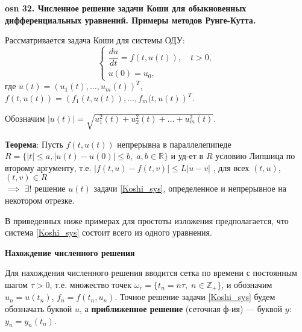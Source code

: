 \setcounter{section}{15}
\setcounter{subsection}{32}
\setcounter{equation}{0}
\textbf{\LARGE osn 32. Численное решение задачи Коши для обыкновенных дифференциальных уравнений. Примеры методов Рунге-Кутта.}


Рассматривается задача Коши для системы ОДУ:
\begin{equation}
%
    \label{Koshi_sys}
    \begin{cases}
        \dfrac{du}{dt} = f(t, u(t)), \quad t > 0, \\
        u(0) = u_0,
    \end{cases}
\end{equation}
%
где
$u(t)=\left(u_1(t), \dots, u_m(t)\right)^T$, $f(t, u(t)) = \left(f_1(t, u(t)), \dots, f_m(t,u(t)\right)^T$.

Обозначим $ | u(t) | = \sqrt{u_1^2(t) + u_2^2(t) + \ldots + u_m^2(t)}$.

\textbf{Теорема}: Пусть $f(t, u(t))$ непрерывна в параллелепипеде 
$ R = \{|t| \leqslant a, | u(t)-u(0)| \leqslant b,\; a, b\in\mathbb{R}\} $ 
и уд-ет в $R$ условию Липшица по второму аргументу, т.е. 
$|f(t, u) - f(t, v)| \leqslant L|u - v|$
, для всех $(t, u)$, $(t, v) \in R$\\ 
$\implies $
$\exists!$ решение $u(t)$ задачи \eqref{Koshi_sys}, определенное и непрерывное на некотором отрезке.



В приведенных ниже примерах для простоты изложения предполагается, что
система \eqref{Koshi_sys} состоит всего из одного уравнения.

\centerline{\textbf{Нахождение численного решения}}


Для нахождения численного решения вводится сетка по времени с постоянным шагом $\tau>0$, т.е. множество точек
$\omega_\tau = \{t_n = n\tau,\;n \in \mathbb{Z}_+\}$, и обозначим
$u_n = u(t_n)$, $f_n = f(t_n, u_n)$.
Точное решение задачи \eqref{Koshi_sys} будем обозначать буквой $u$,
а \textbf{приближенное решение} (сеточная ф-ия) --- буквой $y$: $y_n = y_n(t_n)$.

